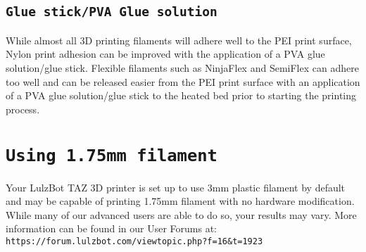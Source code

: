 \subsection{\texttt{Glue stick/PVA Glue solution}}
\label{sec:Glue stick/PVA Glue solution}
 While almost all 3D printing filaments will adhere well to the PEI print surface, Nylon print adhesion can be improved with the application of a PVA glue solution/glue stick. Flexible filaments such as NinjaFlex and SemiFlex can adhere too well and can be released easier from the PEI print surface with an application of a PVA glue solution/glue stick to the heated bed prior to starting the printing process.


\section{\texttt{Using 1.75mm filament}}

Your LulzBot TAZ 3D printer is set up to use 3mm plastic filament by default and may be capable of printing 1.75mm filament with no hardware modification. While many of our advanced users are able to do so, your results may vary.  More information can be found in our User Forums at: \texttt{https://forum.lulzbot.com/viewtopic.php?f=16\&t=1923} 
